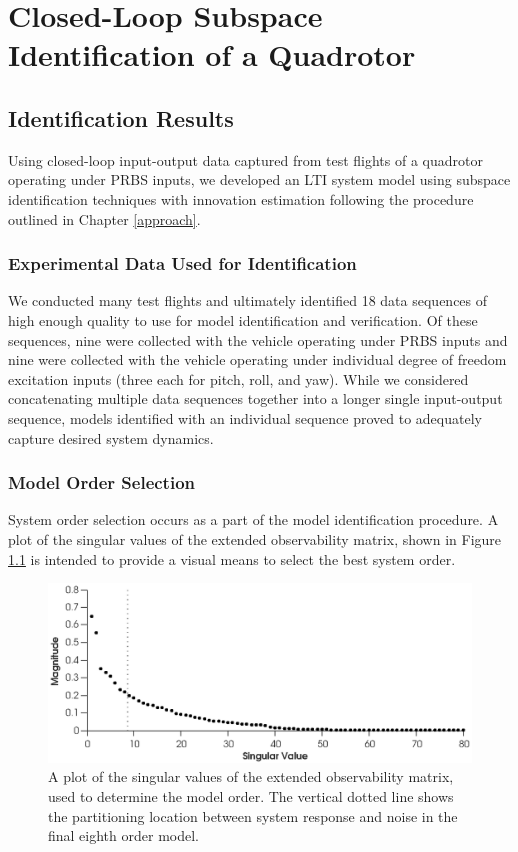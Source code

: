 \chapter{Closed-Loop Subspace Identification of a Quadrotor}\label{results}
\section{Identification Results}
Using closed-loop input-output data captured from test flights of a quadrotor operating under PRBS inputs, we developed an LTI system model using subspace identification techniques with innovation estimation following the procedure outlined in Chapter \ref{approach}.

\subsection{Experimental Data Used for Identification}
We conducted many test flights and ultimately identified 18 data sequences of high enough quality to use for model identification and verification. Of these sequences, nine were collected with the vehicle operating under PRBS inputs and nine were collected with the vehicle operating under individual degree of freedom  excitation inputs (three each for pitch, roll, and yaw). While we considered concatenating multiple data sequences together into a longer single input-output sequence, models identified with an individual sequence proved to adequately capture desired system dynamics.


\subsection{Model Order Selection}
System order selection occurs as a part of the model identification procedure. A plot of the singular values of the extended observability matrix, shown in Figure \ref{singular_values} is intended to provide a visual means to select the best system order. 
\begin{figure}[hbt!]
	\centering
	\includegraphics{../fig/singular_values_parsim.eps}
	\caption{A plot of the singular values of the extended observability matrix, used to determine the model order. The vertical dotted line shows the partitioning location between system response and noise in the final eighth order model.}
	\label{singular_values}
\end{figure}


